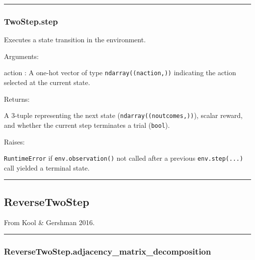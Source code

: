 \begin{center}\rule{0.5\linewidth}{\linethickness}\end{center}

\subsubsection{TwoStep.step}\label{twostep.step}

\begin{Shaded}
\begin{Highlighting}[]
\end{Highlighting}
\end{Shaded}

Executes a state transition in the environment.

Arguments:

action : A one-hot vector of type \texttt{ndarray((naction,))}
indicating the action selected at the current state.

Returns:

A 3-tuple representing the next state (\texttt{ndarray((noutcomes,))}),
scalar reward, and whether the current step terminates a trial
(\texttt{bool}).

Raises:

\texttt{RuntimeError} if \texttt{env.observation()} not called after a
previous \texttt{env.step(...)} call yielded a terminal state.

\begin{center}\rule{0.5\linewidth}{\linethickness}\end{center}

\subsection{ReverseTwoStep}\label{reversetwostep}

\begin{Shaded}
\begin{Highlighting}[]
\end{Highlighting}
\end{Shaded}

From Kool \& Gershman 2016.

\begin{center}\rule{0.5\linewidth}{\linethickness}\end{center}

\subsubsection{ReverseTwoStep.adjacency\_matrix\_decomposition}\label{reversetwostep.adjacency_matrix_decomposition}

